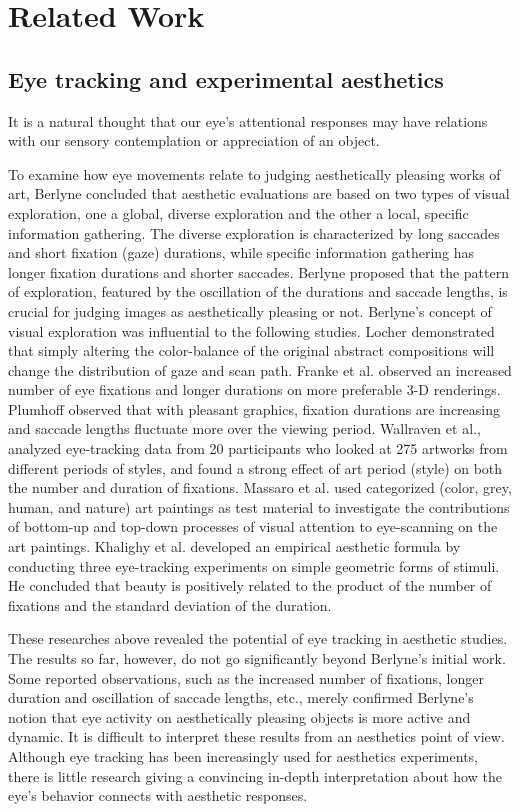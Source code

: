 \section{Related Work}
\label{sec:rel}
\subsection{Eye tracking and experimental aesthetics}
It is a natural thought that our eye's attentional responses may have relations with our sensory contemplation or appreciation of an object.

To examine how eye movements relate to judging aesthetically pleasing works of art, Berlyne\cite{Berlyne1971} concluded that aesthetic evaluations are based on two types of visual exploration, one a global, diverse exploration and the other a local, specific information gathering.
The diverse exploration is characterized by long saccades and short fixation (gaze) durations, while specific information gathering has longer fixation durations and shorter saccades.
Berlyne proposed that the pattern of exploration, featured by the oscillation of the durations and saccade lengths, is crucial for judging images as aesthetically pleasing or not.
Berlyne's concept of visual exploration was influential to the following studies.
Locher\cite{Locher2006} demonstrated that simply altering the color-balance of the original abstract compositions will change the distribution of gaze and scan path.
Franke et al.\cite{Franke2008} observed an increased number of eye fixations and longer durations on more preferable 3-D renderings.
Plumhoff\cite{Plumhoff2009} observed that with pleasant graphics, fixation durations are increasing and saccade lengths fluctuate more over the viewing period.
Wallraven et al.\cite{Wallraven2009}, analyzed eye-tracking data from 20 participants who looked at 275 artworks from different periods of styles, and found a strong effect of art period (style) on both the number and duration of fixations.
Massaro et al.\cite{Massaro} used categorized (color, grey, human, and nature) art paintings as test material to investigate the contributions of bottom-up and top-down processes of visual attention to eye-scanning on the art paintings.
Khalighy et al.\cite{Khalighy2015} developed an empirical aesthetic formula by conducting three eye-tracking experiments on simple geometric forms of stimuli.
He concluded that beauty is positively related to the product of the number of fixations and the standard deviation of the duration.

These researches above revealed the potential of eye tracking in aesthetic studies.
The results so far, however, do not go significantly beyond Berlyne's initial work.
Some reported observations, such as the increased number of fixations, longer duration and oscillation of saccade lengths, etc., merely confirmed Berlyne's notion that eye activity on aesthetically pleasing objects is more active and dynamic.
It is difficult to interpret these results from an aesthetics point of view.
Although eye tracking has been increasingly used for aesthetics experiments, there is little research giving a convincing in-depth interpretation about how the eye's behavior connects with aesthetic responses.


